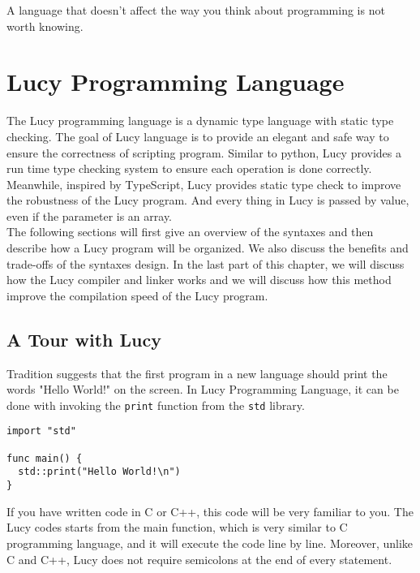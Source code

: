 \begin{savequote}[75mm]
A language that doesn't affect the way you think about programming is not worth knowing.
\end{savequote}

\chapter{Lucy Programming Language}
The Lucy programming language is a dynamic type language with static type checking. The goal of Lucy language is to provide an elegant and safe way to ensure the correctness of scripting program. Similar to python, Lucy provides a run time type checking system to ensure each operation is done correctly. Meanwhile, inspired by TypeScript, Lucy provides static type check to improve the robustness of the Lucy program. And every thing in Lucy is passed by value, even if the parameter is an array. \\
The following sections will first give an overview of the syntaxes and then describe how a Lucy program will be organized. We also discuss the benefits and trade-offs of the syntaxes design. In the last part of this chapter, we will discuss how the Lucy compiler and linker works and we will discuss how this method improve the compilation speed of the Lucy program.


\section{A Tour with Lucy}
Tradition suggests that the first program in a new language should print the words "Hello World!" on the screen. In Lucy Programming Language, it can be done with invoking the \texttt{print} function from the \texttt{std} library.
\begin{lstlisting}
import "std"

func main() {
  std::print("Hello World!\n")
}
\end{lstlisting}
If you have written code in C or C++, this code will be very familiar to you. The Lucy codes starts from the main function, which is very similar to C programming language, and it will execute the code line by line. Moreover, unlike C and C++, Lucy does not require semicolons at the end of every statement.

